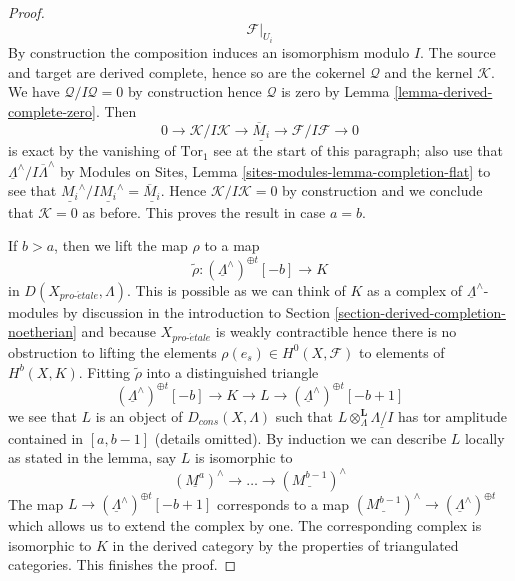 \documentclass[10pt,a4paper]{amsart}
\theoremstyle{plain}
\theoremstyle{definition}
\theoremstyle{remark}
\numberwithin{equation}{subsection}
\def\proetale{{pro\text{-}\acute{e}tale}}
\begin{document}
\begin{proof}
$$\mathcal{F}|_{U_i}
$$
By construction the composition induces an isomorphism modulo $I$.
The source and target are derived complete, hence so are the cokernel
$\mathcal{Q}$ and the kernel $\mathcal{K}$. We have
$\mathcal{Q}/I\mathcal{Q} = 0$ by construction hence $\mathcal{Q}$
is zero by Lemma \ref{lemma-derived-complete-zero}.
Then
$$
0 \to \mathcal{K}/I\mathcal{K} \to
\underline{\overline{M}_i}
\to \mathcal{F}/I\mathcal{F} \to 0
$$
is exact by the vanishing of $\text{Tor}_1$ see at the start of this
paragraph; also use that
$\underline{\Lambda}^\wedge/I\overline{\Lambda}^\wedge$ by
Modules on Sites, Lemma \ref{sites-modules-lemma-completion-flat}
to see that
$\underline{M_i}^\wedge/I\underline{M_i}^\wedge = \underline{\overline{M}_i}$.
Hence $\mathcal{K}/I\mathcal{K} = 0$ by construction and we conclude
that $\mathcal{K} = 0$ as before. This proves the result in case $a = b$.

\medskip\noindent
If $b > a$, then we lift the map $\rho$ to a map
$$
\tilde \rho : (\underline{\Lambda}^\wedge)^{\oplus t}[-b] \longrightarrow K
$$
in $D(X_\proetale, \Lambda)$. This is possible as we can think of
$K$ as a complex of $\underline{\Lambda}^\wedge$-modules by
discussion in the introduction to
Section \ref{section-derived-completion-noetherian}
and because $X_\proetale$ is weakly contractible
hence there is no obstruction to lifting the elements
$\rho(e_s) \in H^0(X, \mathcal{F})$ to elements of $H^b(X, K)$.
Fitting $\tilde \rho$ into a distinguished triangle
$$
(\underline{\Lambda}^\wedge)^{\oplus t}[-b] \to K \to L \to
(\underline{\Lambda}^\wedge)^{\oplus t}[-b + 1]
$$
we see that $L$ is an object of $D_{cons}(X, \Lambda)$ such
that $L \otimes_\Lambda^\mathbf{L} \underline{\Lambda/I}$
has tor amplitude contained in $[a, b - 1]$ (details omitted).
By induction we can describe $L$ locally as stated in the lemma, say
$L$ is isomorphic to
$$
(\underline{M^a})^\wedge \to \ldots \to (\underline{M^{b - 1}})^\wedge
$$
The map
$L \to (\underline{\Lambda}^\wedge)^{\oplus t}[-b + 1]$
corresponds to a map
$(\underline{M^{b - 1}})^\wedge \to (\underline{\Lambda}^\wedge)^{\oplus t}$
which allows us to extend the complex by one. The corresponding
complex is isomorphic to $K$ in the derived category by the properties
of triangulated categories. This finishes the proof.
\end{proof}



\end{document}
